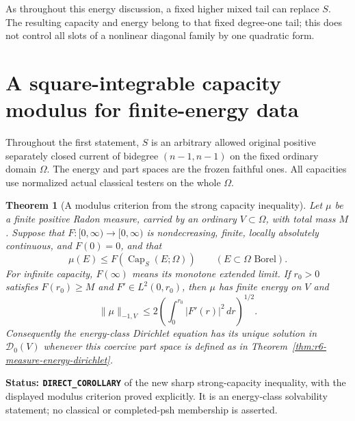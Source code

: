 \documentclass[11pt,a4paper]{article}
\numberwithin{equation}{section}
\newtheorem{theorem}{Theorem}[section]
\theoremstyle{definition}
\theoremstyle{remark}
\begin{document}
As throughout this energy discussion, a fixed higher mixed tail can
replace $S$. The resulting capacity and energy belong to that fixed
degree-one tail; this does not control all slots of a nonlinear
diagonal family by one quadratic form.



\section{A square-integrable capacity modulus for finite-energy data}
\label{sec:r6-energy-growth-modulus}

Throughout the first statement, $S$ is an arbitrary allowed original
positive separately closed current of bidegree $(n-1,n-1)$ on the
fixed ordinary domain $\Omega$. The energy and part spaces are the
frozen faithful ones. All capacities use normalized actual classical
testers on the whole $\Omega$.

\begin{theorem}[A modulus criterion from the strong capacity inequality]
\label{thm:r6-square-integrable-capacity-modulus}
Let $\mu$ be a finite positive Radon measure, carried by an ordinary
$V\subset\Omega$, with total mass $M$. Suppose that $F:[0,\infty)\to
[0,\infty)$ is nondecreasing, finite, locally absolutely continuous,
and $F(0)=0$, and that
\[
            \mu(E)\le F(\operatorname{Cap}_S(E;\Omega))
                          \qquad(E\subset\Omega\text{ Borel}).
\]
For infinite capacity, $F(\infty)$ means its monotone extended limit.
If $r_0>0$ satisfies $F(r_0)\ge M$ and
$F'\in L^2(0,r_0)$, then $\mu$ has finite energy on $V$ and
\begin{equation}
 \|\mu\|_{-1,V}
          \le 2\left(\int_0^{r_0}|F'(r)|^2\,dr\right)^{1/2}.
 \label{eq:r6-square-modulus-energy-bound}
\end{equation}
Consequently the energy-class Dirichlet equation has its unique
solution in $\mathscr D_0(V)$ whenever this coercive part space is
defined as in Theorem~\ref{thm:r6-measure-energy-dirichlet}.
\end{theorem}

\noindent\textbf{Status: \texttt{DIRECT\_COROLLARY}} of the new sharp
strong-capacity inequality, with the displayed modulus criterion
proved explicitly. It is an energy-class solvability statement;
no classical or completed-psh membership is asserted.
\end{document}
